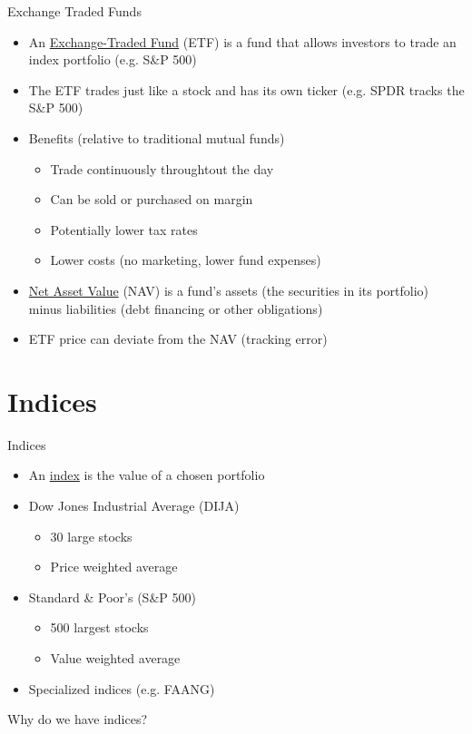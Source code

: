 \documentclass{beamer}
\begin{document}
\begin{frame}{Exchange Traded Funds}
	\begin{itemize}
		\item An \underline{Exchange-Traded Fund} (ETF) is a fund that allows investors to trade an index portfolio (e.g. S\&P 500)
		\item The ETF trades just like a stock and has its own ticker (e.g. SPDR tracks the S\&P 500)
		\item Benefits (relative to traditional mutual funds)
		\begin{itemize}
			\item Trade continuously throughtout the day 
			\item Can be sold or purchased on margin 
			\item Potentially lower tax rates 
			\item Lower costs (no marketing, lower fund expenses)
		\end{itemize}
		\item \underline{Net Asset Value} (NAV) is a fund's assets (the securities in its portfolio) minus liabilities (debt financing or other obligations)
		\item ETF price can deviate from the NAV (tracking error)
	\end{itemize}
\end{frame}

\section{Indices}

\begin{frame}{Indices}
	\begin{itemize}
		\item An \underline{index} is the value of a chosen portfolio
		\item Dow Jones Industrial Average (DIJA)
		\begin{itemize}
			\item 30 large stocks
			\item Price weighted average
		\end{itemize}
		\item Standard \& Poor’s (S\&P 500)
		\begin{itemize}
			\item 500 largest stocks
			\item Value weighted average
		\end{itemize}
		\item Specialized indices (e.g. FAANG)
	\end{itemize}
	\begin{center}
		Why do we have indices? 
	\end{center}
\end{frame}
\end{document}
